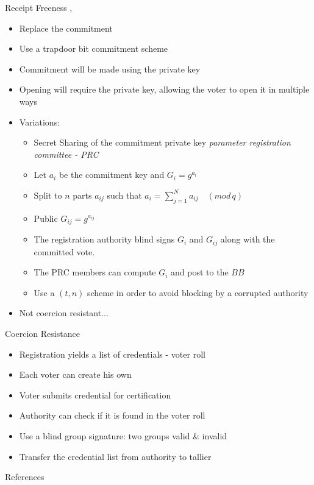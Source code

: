 \documentclass{beamer}
\newcommand{\md}[1]{\quad (mod \, {#1})}
\begin{document}
\begin{frame}[allowframebreaks]{Receipt Freeness \cite{OKA96}, \cite{OKA98}}
\begin{itemize}
\item Replace the commitment
\item Use a trapdoor bit commitment scheme
\item Commitment will be made using the private key
\item Opening will require the private key, allowing the voter to open it in multiple ways
\item Variations:
\begin{itemize}
\item Secret Sharing of the commitment private key \textit{parameter registration committee - PRC}
\item Let $a_i$ be the commitment key and $G_i  = g^{a_i}$
\item Split to $n$ parts $a_{ij}$ such that $a_i = \sum_{j=1}^N a_{ij} \md{q} $
\item Public $G_{ij} = g^{a_{ij}}$
\item The registration authority blind signs $G_i$ and $G_{ij}$ along with the committed vote.
\item The PRC members can compute $G_i$ and post to the $BB$ 
\item Use a $(t,n)$ scheme in order to avoid blocking by a  corrupted authority
\end{itemize}
\item Not coercion resistant...
\end{itemize}
\end{frame}

\begin{frame}{Coercion Resistance}
\begin{itemize}
\item Registration yields a list of credentials - voter roll
\item Each voter can create his own
\item Voter submits credential for certification
\item Authority can check if it is found in the voter roll
\item Use a blind group signature: two groups valid & invalid
\item Transfer the credential list from authority to tallier
\end{itemize}
\end{frame}

\begin{frame}[allowframebreaks]{References}
\begin{small}
\nocite{*}


\end{small}
\end{frame}

 
\end{document}
